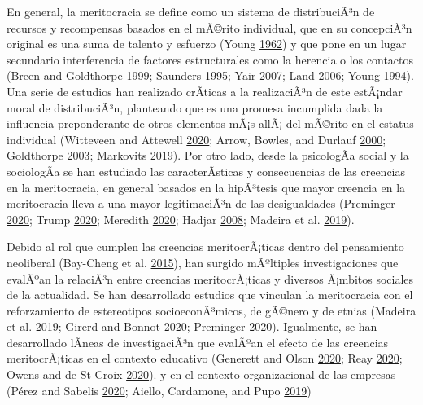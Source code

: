 \documentclass[
]{article}
\begin{document}
En general, la meritocracia se define como un sistema de distribuciÃ³n
de recursos y recompensas basados en el mÃ©rito individual, que en su
concepciÃ³n original es una suma de talento y esfuerzo (Young
\protect\hyperlink{ref-young_rise_1962}{1962}) y que pone en un lugar
secundario interferencia de factores estructurales como la herencia o
los contactos (Breen and Goldthorpe
\protect\hyperlink{ref-breenClassInequalityMeritocracy1999}{1999};
Saunders \protect\hyperlink{ref-saundersMightBritainBe1995}{1995}; Yair
\protect\hyperlink{ref-yairMeritocracy2007}{2007}; Land
\protect\hyperlink{ref-landWeSatTable2006}{2006}; Young
\protect\hyperlink{ref-youngRiseMeritocracy1994}{1994}). Una serie de
estudios han realizado crÃ­ticas a la realizaciÃ³n de este estÃ¡ndar
moral de distribuciÃ³n, planteando que es una promesa incumplida dada la
influencia preponderante de otros elementos mÃ¡s allÃ¡ del mÃ©rito en el
estatus individual (Witteveen and Attewell
\protect\hyperlink{ref-WitteveenReconsideringmeritocraticpower2020a}{2020};
Arrow, Bowles, and Durlauf
\protect\hyperlink{ref-arrow_meritocracy_2000}{2000}; Goldthorpe
\protect\hyperlink{ref-goldthorpe_myth_2003}{2003}; Markovits
\protect\hyperlink{ref-markovits_Meritocracy_2019}{2019}). Por otro
lado, desde la psicologÃ­a social y la sociologÃ­a se han estudiado las
caracterÃ­sticas y consecuencias de las creencias en la meritocracia, en
general basados en la hipÃ³tesis que mayor creencia en la meritocracia
lleva a una mayor legitimaciÃ³n de las desigualdades (Preminger
\protect\hyperlink{ref-PremingerMeritocracyserviceethnocracy2020}{2020};
Trump \protect\hyperlink{ref-TrumpWhenwhyeconomic2020}{2020}; Meredith
\protect\hyperlink{ref-Meredithsocietydivisibleblessed2020}{2020};
Hadjar \protect\hyperlink{ref-hadjar_meritokratie_2008}{2008}; Madeira
et al.
\protect\hyperlink{ref-MadeiraPrimesConsequencesSystematic2019}{2019}).

Debido al rol que cumplen las creencias meritocrÃ¡ticas dentro del
pensamiento neoliberal (Bay-Cheng et al.
\protect\hyperlink{ref-Bay-ChengTrackingHomoOeconomicus2015}{2015}), han
surgido mÃºltiples investigaciones que evalÃºan la relaciÃ³n entre
creencias meritocrÃ¡ticas y diversos Ã¡mbitos sociales de la actualidad.
Se han desarrollado estudios que vinculan la meritocracia con el
reforzamiento de estereotipos socioeconÃ³micos, de gÃ©nero y de etnias
(Madeira et al.
\protect\hyperlink{ref-MadeiraPrimesConsequencesSystematic2019}{2019};
Girerd and Bonnot
\protect\hyperlink{ref-GirerdNeoliberalismIdeologicalBarrier2020}{2020};
Preminger
\protect\hyperlink{ref-PremingerMeritocracyserviceethnocracy2020}{2020}).
Igualmente, se han desarrollado lÃ­neas de investigaciÃ³n que evalÃºan
el efecto de las creencias meritocrÃ¡ticas en el contexto educativo
(Generett and Olson
\protect\hyperlink{ref-GenerettStoriesWeTell2020}{2020}; Reay
\protect\hyperlink{ref-ReayPerilsPenaltiesMeritocracy2020}{2020}; Owens
and de St Croix
\protect\hyperlink{ref-OwensENGINESSOCIALMOBILITY2020}{2020}). y en el
contexto organizacional de las empresas (Pérez and Sabelis
\protect\hyperlink{ref-PerezAdvancingcareersmerit2020}{2020}; Aiello,
Cardamone, and Pupo
\protect\hyperlink{ref-AielloNewevidencefirmuniversity2019}{2019})
\end{document}
